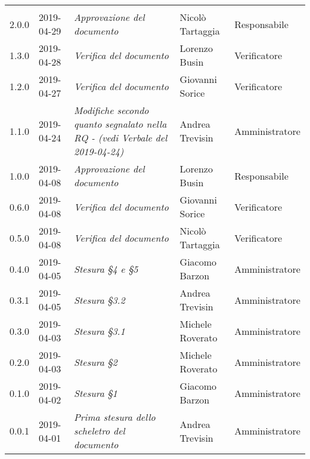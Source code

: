 \newpage 
\section*{}
\begin{longtable}{C{2cm}|C{2.5cm}|C{4.5cm}|C{2.5cm}|C{3cm}}
	
	 &  &  &  &   \\
	\endhead
	
	2.0.0 & 2019-04-29 &  \emph{Approvazione del documento} & Nicolò Tartaggia & Responsabile\\
	\hline
	
	1.3.0 & 2019-04-28 &  \emph{Verifica del documento} & Lorenzo Busin  & Verificatore \\
	\hline
	
	1.2.0 & 2019-04-27 &  \emph{Verifica del documento} & Giovanni Sorice  & Verificatore \\
	\hline
	
	1.1.0 & 2019-04-24 &  \emph{Modifiche secondo quanto segnalato nella RQ - (vedi Verbale del 2019-04-24)} & Andrea Trevisin & Amministratore\\
	\hline
	
	1.0.0 & 2019-04-08 &  \emph{Approvazione del documento} &  Lorenzo Busin & Responsabile\\
	\hline
	
	0.6.0 & 2019-04-08 & \emph{Verifica del documento} & Giovanni Sorice & Verificatore \\
	\hline
	
	0.5.0 & 2019-04-08 & \emph{Verifica del documento} & Nicolò Tartaggia & Verificatore \\
	\hline
	
	0.4.0 & 2019-04-05 & \emph{Stesura §4 e §5} & Giacomo Barzon & Amministratore \\
	\hline
	
	0.3.1 & 2019-04-05 & \emph{Stesura §3.2} & Andrea Trevisin & Amministratore \\
	\hline
	
	0.3.0 & 2019-04-03 & \emph{Stesura §3.1} & Michele Roverato & Amministratore \\
	\hline
	
	0.2.0 & 2019-04-03 & \emph{Stesura §2} & Michele Roverato & Amministratore \\
	\hline
	
	0.1.0 & 2019-04-02 & \emph{Stesura §1} & Giacomo Barzon & Amministratore \\
	\hline
	
	0.0.1 & 2019-04-01 & \emph{Prima stesura dello scheletro del documento} & Andrea Trevisin & Amministratore \\
	
\end{longtable}



\clearpage